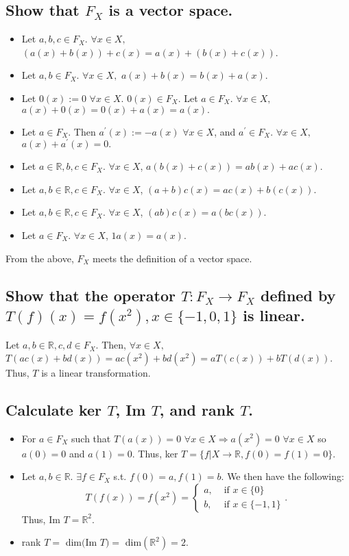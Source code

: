 \documentclass[11pt]{article} %
\begin{document}
\subsection{Show that $F_X$ is a vector space.}
\begin{itemize}
\item
Let $a,b,c \in F_X$. $\forall x \in X,$ $(a(x) + b(x)) +c(x) = a(x) + (b(x) +c(x))$.
\item
Let $a,b \in F_X$. $\forall x \in X,$ $a(x) + b(x) =  b(x) + a(x)$. 
\item
Let $0(x):= 0$  $\forall x \in X$. $0(x) \in F_X.$ Let $a \in F_X$.  $\forall x \in X,$ $a(x) + 0(x) = 0(x) + a(x) = a(x).$
\item
Let $a \in F_X$. Then $a^{'}(x):= -a(x)$ $\forall x \in X$, and $a^{'} \in F_X$.  $\forall x \in X,$  $a(x) + a^{'}(x) = 0.$
\item
Let $a \in \mathbb{R}, b,c \in F_X.$ $\forall x \in X$, $a (b(x) + c(x)) = ab(x) + ac(x).$
\item
Let $a,b \in \mathbb{R}, c \in F_X.$ $\forall x \in X$, $(a+b)c(x) = ac(x) + b(c(x)).$
\item
Let $a,b \in \mathbb{R}, c \in F_X.$ $\forall x \in X$, $(ab)c(x) = a(bc(x)).$
\item
Let $a \in F_X$. $\forall x \in X$, $1 a(x) = a(x)$.
\end{itemize}
From the above, $F_X$ meets the definition of a vector space.
\subsection{Show that the operator $T: F_X \rightarrow F_X$ defined by $T(f)(x) = f(x^2), x \in \{ -1,0,1\}$ is linear.}
Let $a,b \in \mathbb{R}, c,d \in F_X.$ Then, $\forall x \in X,$ $T(ac(x) + bd(x)) = ac(x^2) + bd(x^2) = aT(c(x)) + bT(d(x)).$ Thus, $T$ is a linear transformation.
\subsection{Calculate ker $T$, Im $T$, and rank $T$.}
\begin{itemize}
\item
For $a \in F_X$ such that $T(a(x)) = 0$ $\forall x \in X \Rightarrow a(x^2) = 0$ $\forall x \in X$ so  $a(0) = 0$ and $a(1) = 0.$ Thus, ker $ T = \{f|X \rightarrow \mathbb{R}, f(0) = f(1) = 0\}$.
\item
Let $a,b \in \mathbb{R}.$ $\exists f \in F_X$ s.t. $f(0) = a, f(1) = b$. We then have the following:
\begin{equation*}
T(f(x)) = f(x^2) = 
\begin{cases}
a,& \text{ if } x \in \{ 0\} \\
b,& \text{ if } x \in \{ -1,1\}
\end{cases}.
\end{equation*} 
Thus, Im $T = \mathbb{R}^2$.
\item
rank $T = $ dim$($Im $T) = $ dim$(\mathbb{R}^2) = 2.$ 
\end{itemize}
\end{document}
